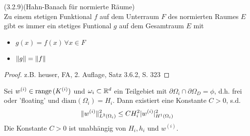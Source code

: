 \begin{satz}(3.2.9)(Hahn-Banach für normierte Räume) \\
Zu einem stetigen Funktional $f$ auf dem Unterraum $F$ des normierten Raumes $E$ gibt es immer ein stetiges Funtional $g$ auf dem Gesamtraum $E$ mit
\begin{itemize}
\item
$g(x)=f(x)  \, \forall x \in F$
\item
$\|g\|=\|f\|$
\end{itemize}
\end{satz}
\begin{proof}
z.B. heuser, FA, 2. Auflage, Satz 3.6.2, S. 323
\end{proof}
\begin{lemma}
Sei $w^{(i)} \in \textnormal{range}\, (K^{(i)})$ und $\omega_i \subset \mathbb{R}^{d}$ ein Teilgebiet mit $\partial \Omega_i \cap \partial \Omega_D = \phi$, d.h. frei oder 'floating' und $\text{diam}(\Omega_i)=H_i$. Dann existiert eine Konstante $C>0$, s.d. 
\[\|w^{(i)}\|^2_{L^2(\Omega_i)} \leq C H_i^2 | w^{(i)}|^2_{H^1(\Omega_i)} \]
Die Konstante $C>0$ ist unabhängig von $H_i,h_i$ und $w^{(i)}$.
\end{lemma}

